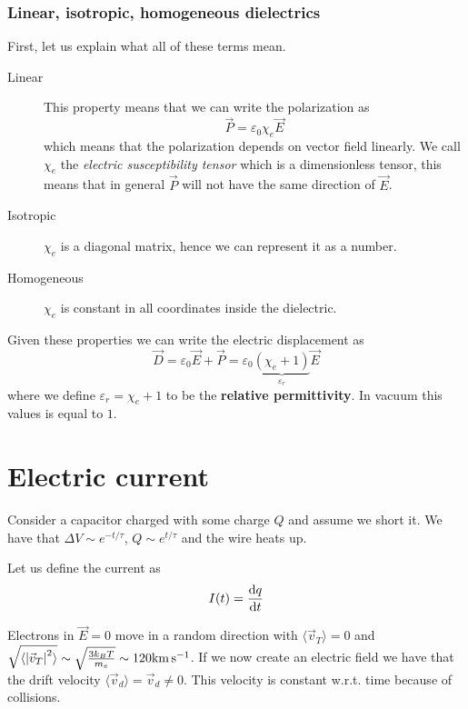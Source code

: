 \documentclass[12pt]{extarticle}
\begin{document}
\subsubsection{Linear, isotropic, homogeneous dielectrics}

First, let us explain what all of these terms mean.
\begin{description}
    \item[Linear]
          This property means that we can write the polarization as
          \begin{equation}
              \vec P = \varepsilon_0 \chi _e \vec E
          \end{equation}
          which means that the polarization depends on vector field linearly.
          We call $\chi_e$ the \emph{electric susceptibility tensor} which is a dimensionless tensor,
          this means that in general $\vec P$ will not have the same direction of $\vec E$.

    \item[Isotropic] $\chi_e$ is a diagonal matrix, hence we can represent it as a number.
    \item[Homogeneous] $\chi_e$ is constant in all coordinates inside the dielectric.
\end{description}

Given these properties we can write the electric displacement as
\begin{equation}
    \vec D = \varepsilon_0 \vec E + \vec P = \varepsilon_0 \underbrace{(\chi_e + 1)}_{\varepsilon_r} \vec E
\end{equation}
where we define $\varepsilon_r = \chi_e + 1$ to be the \textbf{relative permittivity}.
In vacuum this values is equal to $1$.

\section{Electric current}

Consider a capacitor charged with some charge $Q$ and assume we short it.
We have that $\Delta V \sim e^{-t/\tau}$, $Q \sim e^{t/\tau}$ and the wire heats up.

Let us define the current as
\begin{equation}
    I(t) = \dv{q}{t}
\end{equation}

Electrons in $\vec E = 0$ move in a random direction with
$\langle \vec v_T \rangle = 0$ and
$\sqrt{\langle \abs{\vec v_T}^2 \rangle} \sim \sqrt{\frac{3 k_B T}{m_e}} \sim 120 \si{\kilo \meter \per \second}$.
If we now create an electric field we have that the drift velocity $\langle \vec v_d \rangle = \vec v_d \neq 0$.
This velocity is constant w.r.t. time because of collisions.
\end{document}
